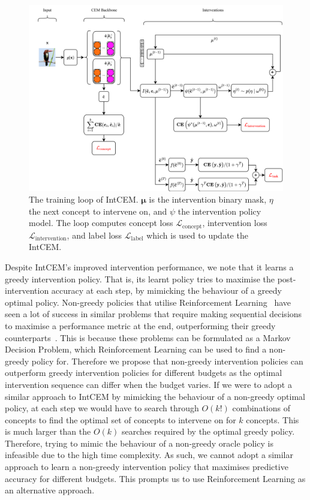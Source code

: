 \begin{figure}[!ht]
    \centering
    \includegraphics[width=\textwidth]{figs/background/intcem.png}
    \caption{The training loop of IntCEM. $\bm{\mu}$ is the intervention binary mask,
    $\eta$ the next concept to intervene on, and $\psi$ the intervention policy model.
    The loop computes concept loss $\mathcal{L}_{\text{concept}}$,
    intervention loss $\mathcal{L}_{\text{intervention}}$, and label loss $\mathcal{L}_{\text{label}}$ which is used to update the
    IntCEM.}
    \label{fig:intcem}
\end{figure}

Despite IntCEM's improved intervention performance,
we note that it learns a greedy intervention policy.
That is, its learnt policy tries to maximise the 
post-intervention accuracy at each step, 
by mimicking the behaviour of a greedy optimal policy. 
Non-greedy policies that utilise
Reinforcement Learning~\cite{rl} have seen a lot of
success in similar problems that require
making sequential decisions to maximise a performance metric at the end,
outperforming their
greedy counterparts~\cite{non-greedy-3, gsmrl, non-greedy-2, non-greedy-1}.
This is because these problems can be formulated as a Markov Decision Problem,
which Reinforcement Learning can be used to find a non-greedy policy for.
Therefore we propose that
non-greedy intervention policies can outperform greedy intervention policies
for different budgets as the optimal intervention sequence can differ when the budget
varies. 
If we were to adopt a similar approach to IntCEM by mimicking the behaviour of a 
non-greedy optimal policy,
at each step we would have to search through
$O(k!)$ combinations of concepts
to find the optimal set of concepts to intervene on for 
$k$ concepts. This is much larger
than the $O(k)$ searches required by the optimal greedy policy.
Therefore, trying to mimic the behaviour of a non-greedy oracle policy is infeasible due to the high time complexity.
As such, we cannot adopt a similar approach to learn a non-greedy intervention policy that maximises predictive accuracy for different budgets.
This prompts us to use Reinforcement Learning as an alternative approach.

